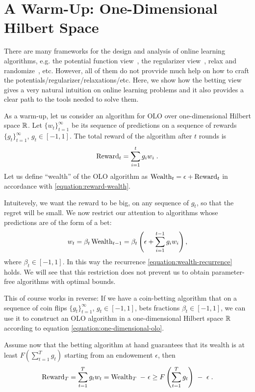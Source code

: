 \section{A Warm-Up: One-Dimensional Hilbert Space}
\label{section:one-dimensional-hilbert-space-olo}

There are many frameworks for the design and analysis of online learning algorithms, e.g. the potential function view~\cite{Cesa-BianchiL06}, the regularizer view~\cite{}, relax and randomize~\cite{}, etc. However, all of them do not provvide much help on how to craft the potentials/regularizer/relaxations/etc.
Here, we show how the betting view gives a very natural intuition on online learning problems and it also provides a clear path to the tools needed to solve them.

As a warm-up, let us consider an algorithm for OLO over one-dimensional Hilbert space $\mathbb{R}$.
Let $\{w_t\}_{t=1}^\infty$ be its sequence of predictions on a sequence of
rewards $\{g_t\}_{t=1}^\infty$, $g_t \in [-1,1]$. The total reward of the
algorithm after $t$ rounds is
\[
\operatorname{Reward}_t = \sum_{i=1}^t g_i w_i \; .
\]
Let us define ``wealth'' of the OLO algorithm as $\operatorname{Wealth}_t = \epsilon +
\operatorname{Reward}_t$ in accordance with \eqref{equation:reward-wealth}.

Intuitevely, we want the reward to be big, on any sequence of $g_t$, so that the regret will be small. We now restrict our attention to algorithms whose predictions are of the form of a bet:
\begin{equation}
\label{equation:one-dimensional-olo}
w_t = \beta_t \operatorname{Wealth}_{t-1}
= \beta_t \left(\epsilon+ \sum_{i=1}^{t-1} g_i w_i \right),
\end{equation}
where $\beta_t \in [-1,1]$. In this way the recurrence \eqref{equation:wealth-recurrence} holds. We will see that this restriction does not prevent us to obtain parameter-free algorithms with optimal bounds.

This of course works in reverse: If we have a coin-betting algorithm that on a
sequence of coin flips $\{g_t\}_{t=1}^\infty$, $g_t \in [-1,1]$, bets fractions
$\beta_t \in [-1,1]$, we can use it to construct an OLO algorithm in a
one-dimensional Hilbert space $\mathbb{R}$ according to equation
\eqref{equation:one-dimensional-olo}.

Assume now that the betting algorithm at hand guarantees that its wealth is at least $F(\sum_{t=1}^T g_t)$ starting from an endowement $\epsilon$, then 
\begin{equation}
\label{equation:one-dimensional-olo-reward-lower-bound}
\Reward_T
= \sum_{t=1}^T g_t w_t
= \Wealth_T \ - \ \epsilon \ge F\left(\sum_{t=1}^T g_t \right) \ - \ \epsilon \; .
\end{equation}

